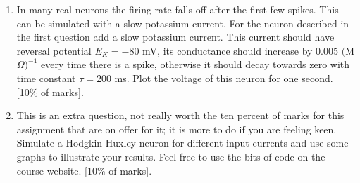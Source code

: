 \documentclass[11pt,a4paper]{scrartcl}
\begin{document}
\begin{enumerate}
\item In many real neurons the firing rate falls off after the first few spikes. This can be simulated with a slow potassium current. For the neuron described in the first question add a slow potassium current. This current should have reversal potential $E_K=-80$ mV, its conductance should increase by 0.005 $($M$\Omega)^{-1}$ every time there is a spike, otherwise it should decay towards zero with time constant $\tau=200$ ms. Plot the voltage of this neuron for one second. [10\% of marks].

\item This is an extra question, not really worth the ten percent of
  marks for this assignment that are on offer for it; it is more to do
  if you are feeling keen. Simulate a Hodgkin-Huxley neuron for
  different input currents and use some graphs to illustrate your
  results. Feel free to use the bits of code on the course
  website. [10\% of marks].

\end{enumerate}
\end{document}
